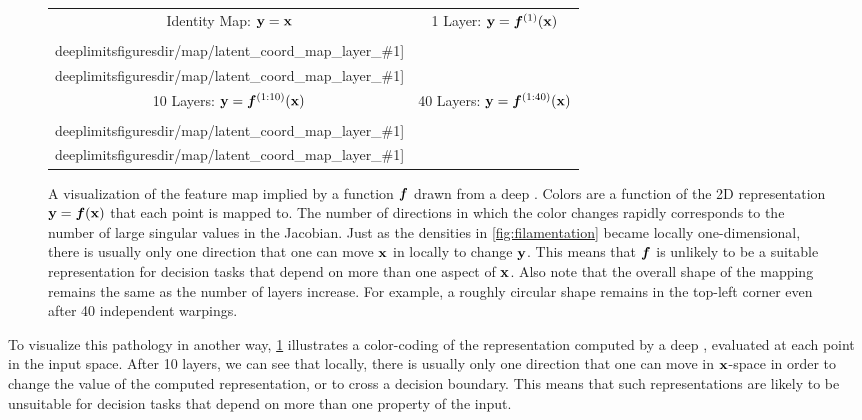 \newcommand{\mappic}[1]{ \texttt{[image: \\deeplimitsfiguresdir/map/latent\_coord\_map\_layer\_\#1]} } 
\newcommand{\mappiccon}[1]{ \texttt{[image: \\deeplimitsfiguresdir/map\_connected/latent\_coord\_map\_layer\_\#1]} }
\begin{figure}
\centering
\begin{tabular}{cc}
\hspace{-0.15in} Identity Map: ${\bf{y}} = {\bf{x}}$ &
\hspace{-0.15in} 1 Layer: ${\bf{y}} = \boldsymbol{f}^{(1)}({\bf{x}})$ \\
\hspace{-0.15in} \mappic{0} & \mappic{1} \\
\hspace{-0.15in} 10 Layers: ${\bf{y}} = \boldsymbol{f}^{(1:10)}({\bf{x}})$ &
\hspace{-0.15in} 40 Layers: ${\bf{y}} = \boldsymbol{f}^{(1:40)}({\bf{x}})$ \\
\hspace{-0.15in} \mappic{10} & \mappic{40}
\end{tabular}
\caption[Visualization of a feature map drawn from a deep \sgp{}]
{A visualization of the feature map implied by a function $\boldsymbol{f}$ drawn from a deep \gp{}.
Colors are a function of the 2D representation ${\bf{y}} = \boldsymbol{f}({\bf{x}})$ that each point is mapped to. %
The number of directions in which the color changes rapidly corresponds to the number of large singular values in the Jacobian.
Just as the densities in \cref{fig:filamentation} became locally one-dimensional, there is usually only one direction that one can move ${\bf{x}}$ in locally to change ${\bf{y}}$.
This means that $\boldsymbol{f}$ is unlikely to be a suitable representation for decision tasks that depend on more than one aspect of ${\bf{x}}$.  Also note that the overall shape of the mapping remains the same as the number of layers increase.
For example, a roughly circular shape remains in the top-left corner even after 40 independent warpings.}
\label{fig:deep_map}
\end{figure}
%
To visualize this pathology in another way, \cref{fig:deep_map} illustrates a color-coding of the representation computed by a deep \gp{}, evaluated at each point in the input space.
After 10 layers, we can see that locally, there is usually only one direction that one can move in ${\bf{x}}$-space in order to change the value of the computed representation, or to cross a decision boundary.
This means that such representations are likely to be unsuitable for decision tasks that depend on more than one property of the input.

